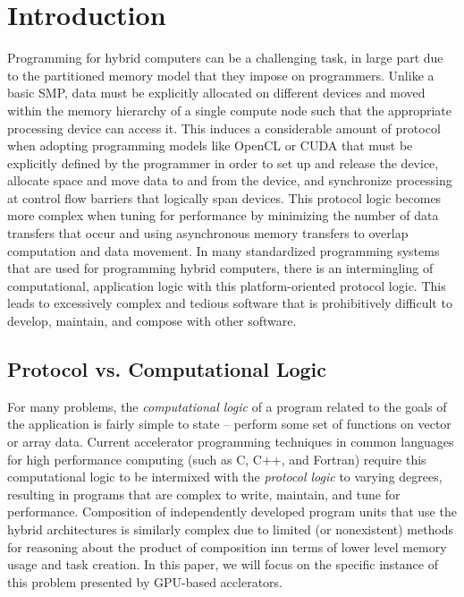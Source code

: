 
\section{Introduction}

Programming for hybrid computers can be a challenging task, in large
part due to the partitioned memory model that they impose on
programmers. Unlike a basic SMP, data must be explicitly allocated on
different devices and moved within the memory hierarchy of a single
compute node such that the appropriate processing device can access
it. This induces a considerable amount of protocol when adopting
programming models like OpenCL or CUDA that must be explicitly defined
by the programmer in order to set up and release the device, allocate
space and move data to and from the device, and synchronize processing
at control flow barriers that logically span devices. This protocol
logic becomes more complex when tuning for performance by minimizing
the number of data transfers that occur and using asynchronous memory
transfers to overlap computation and data movement.  In many
standardized programming systems that are used for programming hybrid
computers, there is an intermingling of computational, application
logic with this platform-oriented protocol logic.  This leads to
excessively complex and tedious software that is prohibitively
difficult to develop, maintain, and compose with other software.

\subsection{Protocol vs. Computational Logic}

For many problems, the \emph{computational logic} of a program related
to the goals of the application is fairly simple to state -- perform
some set of functions on vector or array data. Current accelerator
programming techniques in common languages for high performance
computing (such as C, C++, and Fortran) require this computational
logic to be intermixed with the \emph{protocol logic} to varying
degrees, resulting in programs that are complex to write, maintain,
and tune for performance.  Composition of independently developed
program units that use the hybrid architectures is similarly complex
due to limited (or nonexistent) methods for reasoning about the
product of composition inn terms of lower level memory usage and task
creation.  In this paper, we will focus on the specific instance of this
problem presented by GPU-based acclerators.

